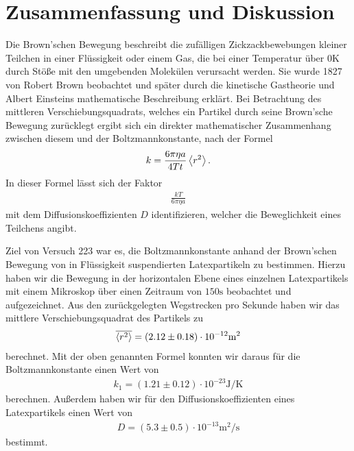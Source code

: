 \section{Zusammenfassung und Diskussion}

Die Brown'schen Bewegung beschreibt die zufälligen Zickzackbewebungen kleiner Teilchen in einer Flüssigkeit oder einem Gas, die bei einer Temperatur über $0\si{\kelvin}$ durch Stöße mit den umgebenden Molekülen verursacht werden. Sie wurde 1827 von Robert Brown beobachtet und später durch die kinetische Gastheorie und Albert Einsteins mathematische Beschreibung erklärt. Bei Betrachtung des mittleren Verschiebungsquadrats, welches ein Partikel durch seine Brown'sche Bewegung zurücklegt ergibt sich ein direkter mathematischer Zusammenhang zwischen diesem und der Boltzmannkonstante, nach der Formel
\begin{gather*}
  k = \frac{6\pi\eta a}{4 T t} \expval{r^2}.
\end{gather*}
In dieser Formel lässt sich der Faktor
\begin{gather*}
 \frac{kT}{6 \pi \eta a}
\end{gather*}
mit dem Diffusionskoeffizienten $D$ identifizieren, welcher die Beweglichkeit eines Teilchens angibt.

Ziel von Versuch 223 war es, die Boltzmannkonstante anhand der Brown'schen Bewegung von in Flüssigkeit suspendierten Latexpartikeln zu bestimmen. Hierzu haben wir die Bewegung in der horizontalen Ebene eines einzelnen Latexpartikels mit einem Mikroskop über einen Zeitraum von $150\si{\second}$ beobachtet und aufgezeichnet. Aus den zurückgelegten Wegstrecken pro Sekunde haben wir das mittlere Verschiebungsquadrat des Partikels zu
\begin{align*}
  \overline{\expval{r^2}} = (2.12 \pm 0.18) \cdot 10^{-12} \si{\meter\squared}
\end{align*}
berechnet. Mit der oben genannten Formel konnten wir daraus für die Boltzmannkonstante einen Wert von
\begin{align*}
  k_{1} = (1.21 \pm  0.12) \cdot 10^{-23}\si{\joule\per\kelvin}
\end{align*}
berechnen. Außerdem haben wir für den Diffusionskoeffizienten eines Latexpartikels einen Wert von 
\begin{align*}
  D = (5.3 \pm 0.5) \cdot 10^{-13} \si{\meter\squared\per\second}
\end{align*}
bestimmt.


